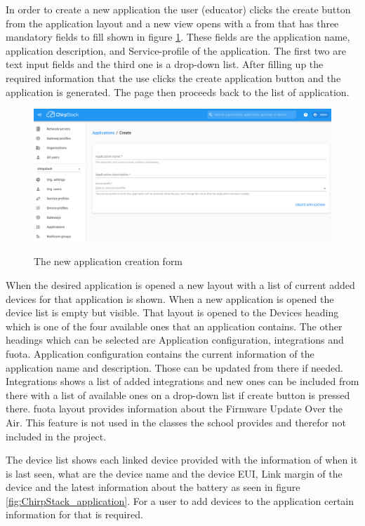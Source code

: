 In order to create a new application the user (educator) clicks the create button from the application layout and a new view opens with a from that has three mandatory fields to fill shown in figure \ref{fig:ChirpStack_new_application}.
These fields are the application name, application description, and Service-profile of the application.
The first two are text input fields and the third one is a drop-down list.
After filling up the required information that the use clicks the create application button and the application is generated.
The page then proceeds back to the list of application.

\begin{figure}[ht]
  \centering
  {\includegraphics[width=\textwidth]{illustration/ChirpStack_new_application.png}}
  \caption{The new application creation form}
  \label{fig:ChirpStack_new_application}
\end{figure}

When the desired application is opened a new layout with a list of current added devices for that application is shown.
When a new application is opened the device list is empty but visible.
That layout is opened to the Devices heading which is one of the four available ones that an application contains.
The other headings which can be selected are Application configuration, integrations and \gls{fuota}.
Application configuration contains the current information of the application name and description.
Those can be updated from there if needed.
Integrations shows a list of added integrations and new ones can be included from there with a list of available ones on a drop-down list if create button is pressed there.
\gls{fuota} layout provides information about the Firmware Update Over the Air.
This feature is not used in the classes the school provides and therefor not included in the project. 

The device list shows each linked device provided with the information of when it is last seen, what are the device name and the device EUI, Link margin of the device and the latest information about the battery as seen in figure \ref{fig:ChirpStack_application}.
For a user to add devices to the application certain information for that is required.

